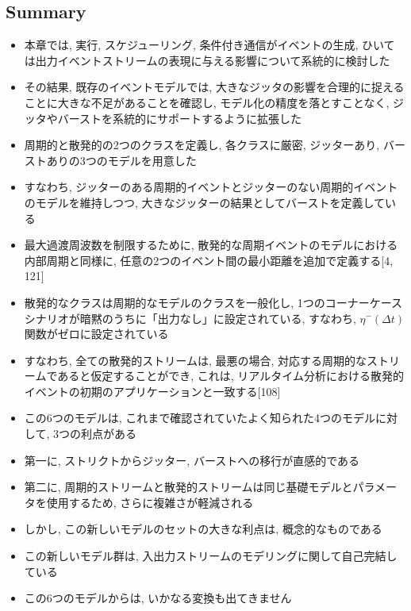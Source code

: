 \subsection{Summary}
\label{ssec: summary}

\begin{frame}{}
    \begin{itemize}
        \item 本章では, 実行, スケジューリング, 条件付き通信がイベントの生成, ひいては出力イベントストリームの表現に与える影響について系統的に検討した
        \item その結果, 既存のイベントモデルでは, 大きなジッタの影響を合理的に捉えることに大きな不足があることを確認し, モデル化の精度を落とすことなく, ジッタやバーストを系統的にサポートするように拡張した
    \end{itemize}
\end{frame}

\begin{frame}{}
    \begin{itemize}
        \item 周期的と散発的の2つのクラスを定義し, 各クラスに厳密, ジッターあり, バーストありの3つのモデルを用意した
        \item すなわち, ジッターのある周期的イベントとジッターのない周期的イベントのモデルを維持しつつ, 大きなジッターの結果としてバーストを定義している
        \item 最大過渡周波数を制限するために, 散発的な周期イベントのモデルにおける内部周期と同様に, 任意の2つのイベント間の最小距離を追加で定義する[4, 121]
        \item 散発的なクラスは周期的なモデルのクラスを一般化し, 1つのコーナーケースシナリオが暗黙のうちに「出力なし」に設定されている, すなわち, $\eta^{-}(\Delta t)$ 関数がゼロに設定されている
        \item すなわち, 全ての散発的ストリームは, 最悪の場合, 対応する周期的なストリームであると仮定することができ, これは, リアルタイム分析における散発的イベントの初期のアプリケーションと一致する[108]
    \end{itemize}
\end{frame}

\begin{frame}{}
    \begin{itemize}
        \item この6つのモデルは, これまで確認されていたよく知られた4つのモデルに対して, 3つの利点がある
        \item 第一に, ストリクトからジッター, バーストへの移行が直感的である
        \item 第二に, 周期的ストリームと散発的ストリームは同じ基礎モデルとパラメータを使用するため, さらに複雑さが軽減される
        \item しかし, この新しいモデルのセットの大きな利点は, 概念的なものである
        \item この新しいモデル群は, 入出力ストリームのモデリングに関して自己完結している
        \item この6つのモデルからは, いかなる変換も出てきません
    \end{itemize}
\end{frame}

